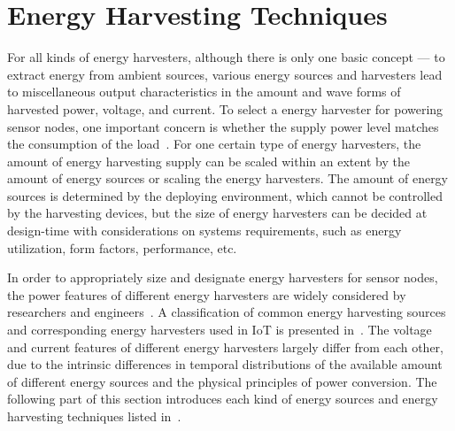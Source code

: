 \section{Energy Harvesting Techniques} \label{sec:eh}

For all kinds of energy harvesters, although there is only one basic concept --- to extract energy from ambient sources, various energy sources and harvesters lead to miscellaneous output characteristics in the amount and wave forms of harvested power, voltage, and current. To select a energy harvester for powering sensor nodes, one important concern is whether the supply power level matches the consumption of the load~\cite{shaikh2016energy}. For one certain type of energy harvesters, the amount of energy harvesting supply can be scaled within an extent by the amount of energy sources or scaling the energy harvesters. The amount of energy sources is determined by the deploying environment, which cannot be controlled by the harvesting devices, but the size of energy harvesters can be decided at design-time with considerations on systems requirements, such as energy utilization, form factors, performance, etc. 

In order to appropriately size and designate energy harvesters for sensor nodes, the power features of different energy harvesters are widely considered by researchers and engineers~\cite{moss2015scaling}. A classification of common energy harvesting sources and corresponding energy harvesters used in IoT is presented in~. The voltage and current features of different energy harvesters largely differ from each other, due to the intrinsic differences in temporal distributions of the available amount of different energy sources and the physical principles of power conversion. The following part of this section introduces each kind of energy sources and energy harvesting techniques listed in~.

